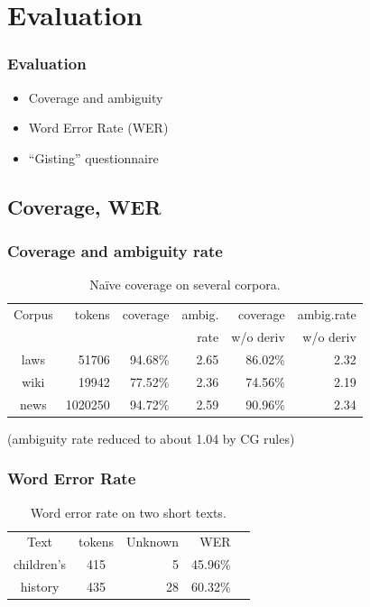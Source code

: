 \documentclass[notes=hide]{beamer}
\begin{document}
\section{Evaluation}
\begin{frame}\frametitle{Evaluation}
  \begin{itemize}
  \item Coverage and ambiguity
  \item Word Error Rate (WER)
  \item ``Gisting'' questionnaire
  \end{itemize}
\end{frame}

\subsection{Coverage, WER}
\begin{frame}\frametitle{Coverage and ambiguity rate}
  \begin{center}
    \begin{table}
      \begin{tabular}{crrrrr}
        Corpus     & tokens   & coverage & ambig.      & coverage   & ambig.rate  \\
        &          &          & rate        & w/o deriv  & w/o deriv \\
        laws       &  51706   & 94.68\%  & 2.65        & 86.02\%    & 2.32 \\
        wiki       & 19942    & 77.52\%  & 2.36        & 74.56\%    & 2.19 \\
        news       & 1020250  & 94.72\%  & 2.59        & 90.96\%    & 2.34 \\
      \end{tabular}
      \caption{Na\"{i}ve coverage on several corpora.}
      \label{table:cov}

      (ambiguity rate reduced to about 1.04 by CG rules)
    \end{table}
  \end{center}
\end{frame}

\begin{frame}\frametitle{Word Error Rate}
  \begin{table}
    \begin{center}
      \begin{tabular}{ccrrr}
        Text       & tokens & Unknown & WER  \\
        children's & 415     & 5      & 45.96\% \\
        history    & 435     & 28     & 60.32\%  \\
      \end{tabular}
      \caption{Word error rate on two short texts.}
      \label{table:wer}
    \end{center}
  \end{table}
\end{frame}
\end{document}
